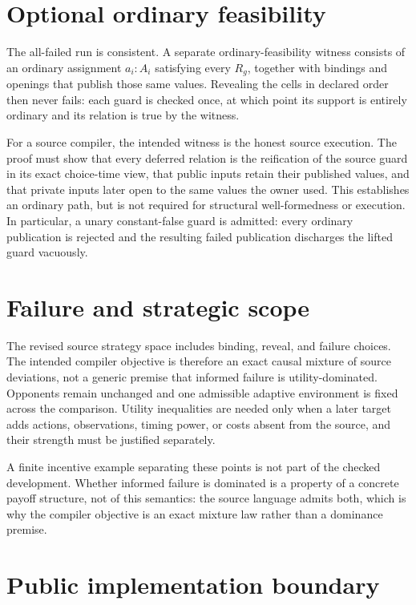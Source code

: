 \documentclass[11pt]{article}
\begin{document}
\section{Optional ordinary feasibility}

The all-failed run is consistent. A separate ordinary-feasibility witness
consists of an ordinary assignment $a_i:A_i$ satisfying every $R_g$, together
with bindings and openings that publish those same values.  Revealing the cells
in declared order then never fails: each guard is checked once, at which point
its support is entirely ordinary and its relation is true by the witness.

For a source compiler, the intended witness is the honest source execution.
The proof must show that every deferred relation is the reification of the
source guard in its exact choice-time view, that public inputs retain their
published values, and that private inputs later open to the same values the
owner used. This establishes an ordinary path, but is not required for
structural well-formedness or execution. In particular, a unary constant-false
guard is admitted: every ordinary publication is rejected and the resulting
failed publication discharges the lifted guard vacuously.

\section{Failure and strategic scope}

The revised source strategy space includes binding, reveal, and failure choices.
The intended compiler objective is therefore an exact causal mixture of source
deviations, not a generic premise that informed failure is utility-dominated.
Opponents remain unchanged and one admissible adaptive environment is fixed
across the comparison. Utility inequalities are needed only when a later target
adds actions, observations, timing power, or costs absent from the source, and
their strength must be justified separately.

A finite incentive example separating these points is not part of the checked
development. Whether informed failure is dominated is a property of a concrete
payoff structure, not of this semantics: the source language admits both, which
is why the compiler objective is an exact mixture law rather than a dominance
premise.

\section{Public implementation boundary}
\end{document}
